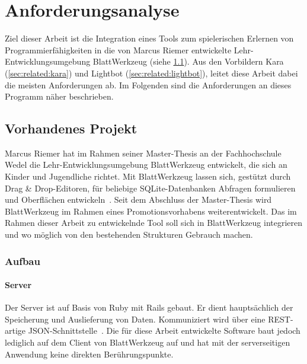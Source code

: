 \chapter{Anforderungsanalyse}
\label{sec:requirements}

Ziel dieser Arbeit ist die Integration eines Tools zum spielerischen Erlernen von Programmierfähigkeiten in die von Marcus Riemer entwickelte Lehr-Entwicklungsumgebung BlattWerkzeug (siehe \ref{sec:requirements:existing}). Aus den Vorbildern Kara (\ref{sec:related:kara}) und Lightbot (\ref{sec:related:lightbot}), leitet diese Arbeit dabei die meisten Anforderungen ab. Im Folgenden sind die Anforderungen an dieses Programm näher beschrieben.

\section{Vorhandenes Projekt}
\label{sec:requirements:existing}

Marcus Riemer hat im Rahmen seiner Master-Thesis an der Fachhochschule Wedel die Lehr-Entwicklungsumgebung BlattWerkzeug entwickelt, die sich an Kinder und Jugendliche richtet. Mit BlattWerkzeug lassen sich, gestützt durch Drag \& Drop-Editoren, für beliebige SQLite-Datenbanken Abfragen formulieren und Oberflächen entwickeln~\cite[2]{riemer2016}. Seit dem Abschluss der Master-Thesis wird BlattWerkzeug im Rahmen eines Promotionsvorhabens weiterentwickelt. Das im Rahmen dieser Arbeit zu entwickelnde Tool soll sich in BlattWerkzeug integrieren und wo möglich von den bestehenden Strukturen Gebrauch machen.

\subsection{Aufbau}

\subsubsection{Server}

Der Server ist auf Basis von Ruby mit Rails gebaut. Er dient hauptsächlich der Speicherung und Auslieferung von Daten. Kommuniziert wird über eine REST-artige JSON-Schnittstelle~\cite[94]{riemer2016}. Die für diese Arbeit entwickelte Software baut jedoch lediglich auf dem Client von BlattWerkzeug auf und hat mit der serverseitigen Anwendung keine direkten Berührungspunkte.

